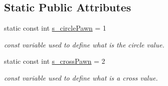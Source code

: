 \subsection*{Static Public Attributes}
\begin{DoxyCompactItemize}
\item 
\mbox{\label{class_tic_tac_toe_game_manager_a23c11b057becb1c20a8e4f6c5389bf87}} 
static const int \hyperlink{class_tic_tac_toe_game_manager_a23c11b057becb1c20a8e4f6c5389bf87}{s\+\_\+circle\+Pawn} = 1
\begin{DoxyCompactList}\small\item\em const variable used to define what is the circle value. \end{DoxyCompactList}\item 
\mbox{\label{class_tic_tac_toe_game_manager_a34b41476fbb13bc8eec7b7f638524971}} 
static const int \hyperlink{class_tic_tac_toe_game_manager_a34b41476fbb13bc8eec7b7f638524971}{s\+\_\+cross\+Pawn} = 2
\begin{DoxyCompactList}\small\item\em const variable used to define what is a cross value. \end{DoxyCompactList}\end{DoxyCompactItemize}
